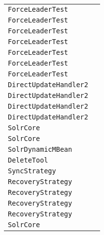 \begin{center}
\begin{tabular}{ll}
\lstinline/ForceLeaderTest/&\raisebox{0pt}{\lstinline/bringBackOldLeaderAndSendDoc(String)/}\\
\lstinline/ForceLeaderTest/&\raisebox{0pt}{\lstinline/bringBackOldLeaderAndSendDoc(String)/}\\
\lstinline/ForceLeaderTest/&\raisebox{0pt}{\lstinline/bringBackOldLeaderAndSendDoc(String)/}\\
\lstinline/ForceLeaderTest/&\raisebox{0pt}{\lstinline/bringBackOldLeaderAndSendDoc(String)/}\\
\lstinline/ForceLeaderTest/&\raisebox{0pt}{\lstinline/bringBackOldLeaderAndSendDoc(String)/}\\
\lstinline/ForceLeaderTest/&\raisebox{0pt}{\lstinline/bringBackOldLeaderAndSendDoc(String)/}\\
\lstinline/ForceLeaderTest/&\raisebox{0pt}{\lstinline/bringBackOldLeaderAndSendDoc(String)/}\\
\lstinline/DirectUpdateHandler2/&\raisebox{0pt}{\lstinline/rollback(RollbackUpdatecommand))/}\\
\lstinline/DirectUpdateHandler2/&\raisebox{0pt}{\lstinline/rollback(RollbackUpdatecommand))/}\\
\lstinline/DirectUpdateHandler2/&\raisebox{0pt}{\lstinline/rollback(RollbackUpdatecommand))/}\\
\lstinline/DirectUpdateHandler2/&\raisebox{0pt}{\lstinline/rollback(RollbackUpdatecommand))/}\\
\lstinline/SolrCore/&\raisebox{0pt}{\lstinline/checkStale(String,int)/}\\
\lstinline/SolrCore/&\raisebox{0pt}{\lstinline/checkStale(String,int)/}\\
\lstinline/SolrDynamicMBean/&\raisebox{0pt}{\lstinline/AttributeListgetAttributes(String[]attributes)/}\\
\lstinline/DeleteTool/&\raisebox{0pt}{\lstinline/deleteCollection(CloudSolrClient,CommandLine)/}\\
\lstinline/SyncStrategy/&\raisebox{0pt}{\lstinline/requestRecoveries()/}\\
\lstinline/RecoveryStrategy/&\raisebox{0pt}{\lstinline/replay(SolrCore)/}\\
\lstinline/RecoveryStrategy/&\raisebox{0pt}{\lstinline/replay(SolrCore)/}\\
\lstinline/RecoveryStrategy/&\raisebox{0pt}{\lstinline/replay(SolrCore)/}\\
\lstinline/RecoveryStrategy/&\raisebox{0pt}{\lstinline/replay(SolrCore)/}\\
\lstinline/SolrCore/&\raisebox{0pt}{\lstinline/checkStale(String,int)/}\\

\end{tabular}
\end{center}
